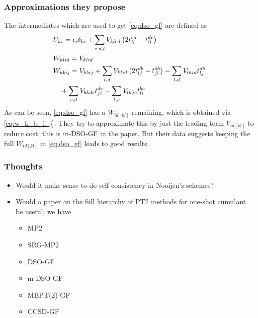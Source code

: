 \begin{frame}
\frametitle{Approximations they propose}
The intermediates which are used to get \ref{eq:dso_gf} are defined as
\begin{align}
& U_{k i}=\epsilon_{i} \delta_{k i}+\sum_{c, d, l} V_{k l c d}\left(2 t_{i l}^{c d}-t_{i l}^{d c}\right) \\
& W_{k l i d}=V_{k l i d} \\
& W_{k b i j}=V_{k b i j}+\sum_{l, d} V_{k l i d}\left(2 t_{l j}^{d b}-t_{j l}^{d b}\right)-\sum_{l, d} V_{l k i d} t_{l j}^{d b}
\label{eq:w_k_b_i_j} \\
& \quad+\sum_{c, d} V_{b k d c} t_{j i}^{d c}-\sum_{l, c} V_{l k j c} t_{l i}^{b c} \notag
\end{align}
As can be seen, \ref{eq:dso_gf} has a $W_{i d[k l]}$ remaining, which is obtained via \ref{eq:w_k_b_i_j}. They try to approximate this by just the leading term $V_{i d[k l]}$ to reduce cost; this is m-DSO-GF in the paper. But their data suggests keeping the full $W_{i d[k l]}$ in \ref{eq:dso_gf} leads to good results. 
\end{frame}

\begin{frame}
\frametitle{Thoughts}%

\begin{itemize}
    \item Would it make sense to do self consistency in Nooijen's schemes?
    \item Would a paper on the full hierarchy of PT2 methods for one-shot cumulant be useful; we have
    \begin{itemize}
        \item MP2
        \item SRG-MP2
        \item DSO-GF
        \item m-DSO-GF
        \item MBPT(2)-GF
        \item CCSD-GF
        \end{itemize}
    \end{itemize}
\end{frame}

